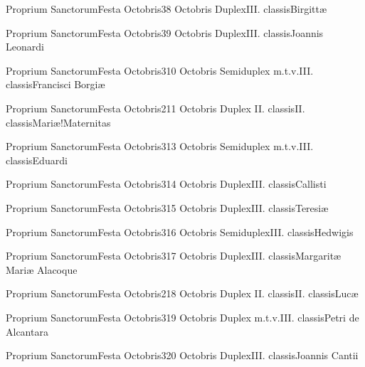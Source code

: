 \documentclass[psalterium-feriale.tex]{subfiles}
\begin{document}
	{Proprium Sanctorum}{Festa Octobris}{3}{8 Octobris}
	{Duplex}{III. classis}{Birgittæ}
	{}
	{}
\MUNNaRubric

	{Proprium Sanctorum}{Festa Octobris}{3}{9 Octobris}
	{Duplex}{III. classis}{Joannis Leonardi}
	{}
	{}
\COPObRubric

	{Proprium Sanctorum}{Festa Octobris}{3}{10 Octobris}
	{Semiduplex m.t.v.}{III. classis}{Francisci Borgiæ}
	{}
	{}
\COPOaRubric

	{Proprium Sanctorum}{Festa Octobris}{2}{11 Octobris}
	{Duplex II. classis}{II. classis}{Mariæ!Maternitas}
	{}
	{}
\psalmodiapropria

	{Proprium Sanctorum}{Festa Octobris}{3}{13 Octobris}
	{Semiduplex m.t.v.}{III. classis}{Eduardi}
	{}
	{}
\COPOaRubric

	{Proprium Sanctorum}{Festa Octobris}{3}{14 Octobris}
	{Duplex}{III. classis}{Callisti}
	{}
	{}
\UMEXcRubric

	{Proprium Sanctorum}{Festa Octobris}{3}{15 Octobris}
	{Duplex}{III. classis}{Teresiæ}
	{}
	{}

	{Proprium Sanctorum}{Festa Octobris}{3}{16 Octobris}
	{Semiduplex}{III. classis}{Hedwigis}
	{}
	{}
\MUNNaRubric

	{Proprium Sanctorum}{Festa Octobris}{3}{17 Octobris}
	{Duplex}{III. classis}{Margaritæ Mariæ Alacoque}
	{}
	{}
\MUVNbRubric

	{Proprium Sanctorum}{Festa Octobris}{2}{18 Octobris}
	{Duplex II. classis}{II. classis}{Lucæ}
	{}
	{}
\psalmodiapropria

	{Proprium Sanctorum}{Festa Octobris}{3}{19 Octobris}
	{Duplex m.t.v.}{III. classis}{Petri de Alcantara}
	{}
	{}
\COPObRubric

	{Proprium Sanctorum}{Festa Octobris}{3}{20 Octobris}
	{Duplex}{III. classis}{Joannis Cantii}
	{}
	{}
\end{document}
